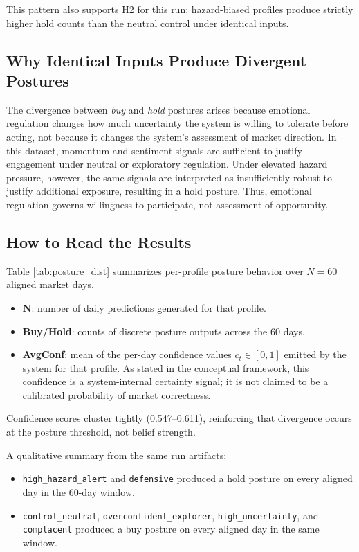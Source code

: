 \documentclass[12pt,a4paper]{article}
\begin{document}
This pattern also supports H2 for this run: hazard-biased profiles produce strictly higher hold counts than the neutral control under identical inputs.

\subsection{Why Identical Inputs Produce Divergent Postures}

The divergence between \emph{buy} and \emph{hold} postures arises because emotional regulation changes how much uncertainty the system is willing to tolerate before acting, not because it changes the system's assessment of market direction. In this dataset, momentum and sentiment signals are sufficient to justify engagement under neutral or exploratory regulation. Under elevated hazard pressure, however, the same signals are interpreted as insufficiently robust to justify additional exposure, resulting in a hold posture. Thus, emotional regulation governs willingness to participate, not assessment of opportunity.

\subsection{How to Read the Results}

Table \ref{tab:posture_dist} summarizes per-profile posture behavior over $N=60$ aligned market days.

\begin{itemize}
	\item \textbf{N}: number of daily predictions generated for that profile.
	\item \textbf{Buy/Hold}: counts of discrete posture outputs across the 60 days.
	\item \textbf{AvgConf}: mean of the per-day confidence values $c_t \in [0,1]$ emitted by the system for that profile. As stated in the conceptual framework, this confidence is a system-internal certainty signal; it is not claimed to be a calibrated probability of market correctness.
\end{itemize}

Confidence scores cluster tightly (0.547–0.611), reinforcing that divergence occurs at the posture threshold, not belief strength.

A qualitative summary from the same run artifacts:

\begin{itemize}
	\item \texttt{high\_hazard\_alert} and \texttt{defensive} produced a hold posture on every aligned day in the 60-day window.
	\item \texttt{control\_neutral}, \texttt{overconfident\_explorer}, \texttt{high\_uncertainty}, and \texttt{complacent} produced a buy posture on every aligned day in the same window.
\end{itemize}
\end{document}

